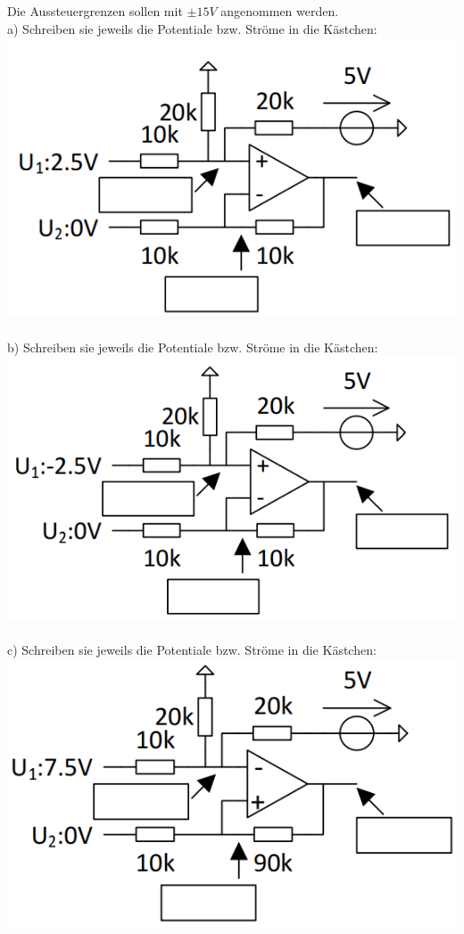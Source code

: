 \documentclass[A4]{scrartcl}
\begin{document}
  Die Aussteuergrenzen sollen mit $\pm 15V$ angenommen werden.\\
  a) Schreiben sie jeweils die Potentiale bzw. Ströme in die Kästchen:\\
  \includegraphics{Schaltung2.png}\\\\
  b) Schreiben sie jeweils die Potentiale bzw. Ströme in die Kästchen:\\
  \includegraphics{Schaltung3.png}\\\\
  c) Schreiben sie jeweils die Potentiale bzw. Ströme in die Kästchen:\\
  \includegraphics{Schaltung4.png}\\\\
\end{document}
